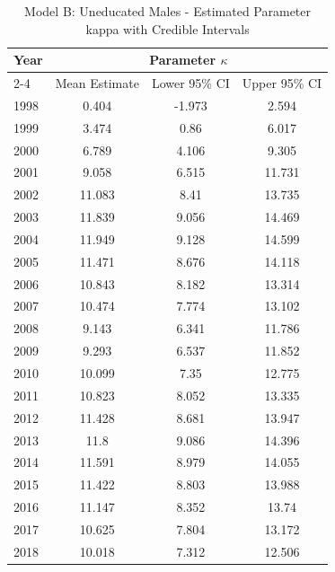 \begin{landscape}
\begin{table}[htbp]
\centering
\caption{Model B: Uneducated Males - Estimated Parameter kappa  with Credible Intervals}
\label{tab:parameters_k13}
\begin{tabular}{@{}lccc@{}}
\toprule
Year & \multicolumn{3}{c}{Parameter \(\kappa\)} \\
\cmidrule(lr){2-4}
      & Mean Estimate & Lower 95\% CI & Upper 95\% CI \\
\midrule
1998 & 0.404 & -1.973 & 2.594 \\
1999 & 3.474 & 0.86 & 6.017 \\
2000 & 6.789 & 4.106 & 9.305 \\
2001 & 9.058 & 6.515 & 11.731 \\
2002 & 11.083 & 8.41 & 13.735 \\
2003 & 11.839 & 9.056 & 14.469 \\
2004 & 11.949 & 9.128 & 14.599 \\
2005 & 11.471 & 8.676 & 14.118 \\
2006 & 10.843 & 8.182 & 13.314 \\
2007 & 10.474 & 7.774 & 13.102 \\
2008 & 9.143 & 6.341 & 11.786 \\
2009 & 9.293 & 6.537 & 11.852 \\
2010 & 10.099 & 7.35 & 12.775 \\
2011 & 10.823 & 8.052 & 13.335 \\
2012 & 11.428 & 8.681 & 13.947 \\
2013 & 11.8 & 9.086 & 14.396 \\
2014 & 11.591 & 8.979 & 14.055 \\
2015 & 11.422 & 8.803 & 13.988 \\
2016 & 11.147 & 8.352 & 13.74 \\
2017 & 10.625 & 7.804 & 13.172 \\
2018 & 10.018 & 7.312 & 12.506 \\
\bottomrule
\end{tabular}
\end{table}
\end{landscape}